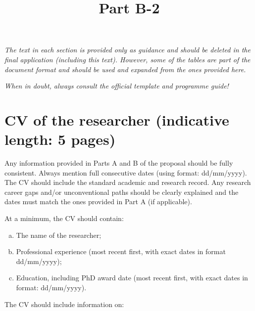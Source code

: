 \documentclass[12pt,draftproposal]{msca-pf}
\title{Part B-2}
\author{}
\date{}
\begin{document}
\maketitle

\textit{The text in each section is provided only as guidance and should be deleted
in the final application (including this text). However, some of the tables
are part of the document format and should be used and expanded from the ones
provided here.}

\textit{When in doubt, always consult the official template and programme guide!}

\section{CV of the researcher (indicative length: 5 pages)}
\label{sc:cv}

Any information provided in Parts A and B of the proposal should be fully consistent.
Always mention full consecutive dates (using format: dd/mm/yyyy). The CV should
include the standard academic and research record. Any research career gaps
and/or unconventional paths should be clearly explained and the dates must match
the ones provided in Part A (if applicable).

At a minimum, the CV should contain:

\begin{enumerate}[a)]
    \item The name of the researcher;
    \item Professional experience (most recent first, with exact dates in format
    dd/mm/yyyy);
    \item Education, including PhD award date (most recent first, with exact
    dates in format: dd/mm/yyyy).
\end{enumerate}

The CV should include information on:
\end{document}
